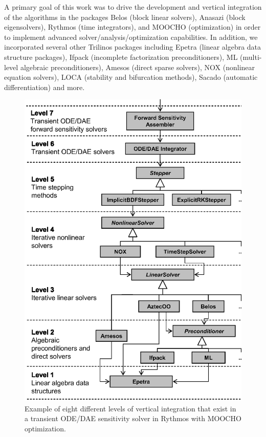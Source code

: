 \documentclass[pdf,ps2pdf,11pt]{SANDreport}
\begin{document}
A primary goal of this work was to drive the development and vertical
integration of the algorithms in the packages Belos (block linear solvers),
Anasazi (block eigensolvers), Rythmos (time integrators), and MOOCHO
(optimization) in order to implement advanced solver/analysis/optimization
capabilities.  In addition, we incorporated several other Trilinos packages
including Epetra (linear algebra data structure packages), Ifpack (incomplete
factorization preconditioners), ML (multi-level algebraic preconditioners),
Amesos (direct sparse solvers), NOX (nonlinear equation solvers), LOCA
(stability and bifurcation methods), Sacado (automatic differentiation) and
more.

{\bsinglespace
\begin{figure}[p]
\begin{center}
\includegraphics*[scale=0.87]{VerticalPackageIntegration}
\end{center}
\caption[Eight different levels of vertical integration in modular
transient sensitivity solver and optimizer] {
\label{fig:VerticalPackageIntegration}
Example of eight different levels of vertical integration that exist in a
transient ODE/DAE sensitivity solver in Rythmos with MOOCHO optimization.}
\end{figure}
\esinglespace}
\end{document}
